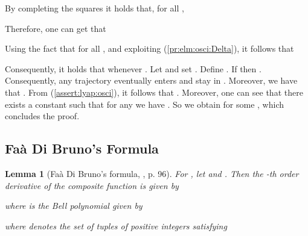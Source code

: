\documentclass[letterpaper, 10pt]{article}
\newtheorem{lem}{Lemma}
\newcommand{\rref}[1]{(\ref{#1})}
\begin{document}
By completing the squares it holds that, for all ,

Therefore, one can get that

Using the fact that  for all , and exploiting \rref{pr:elm:osci:Delta}, it follows that
 
Consequently, it holds that  whenever . Let  and set . Define .  If  then . Consequently, any trajectory eventually enters and stay in . Moreover, we have that  . From \rref{assert:lyap:osci}, it follows that . Moreover, one can see that there exists a constant  such that for any  we have . So we obtain 
 for some , which concludes the proof.


\subsection{Fa\`a Di Bruno's Formula}

\begin{lem}[Fa\`a Di Bruno's formula, \cite{fdb}, p. 96]
\label{lem:fa_di}
For  , let  and . Then the -th order derivative of the composite function  is given by

where  is the Bell polynomial given by

where  denotes the set of tuples   of positive integers satisfying 

\end{lem}





\end{document}
